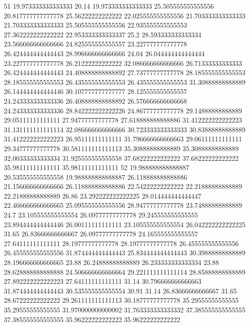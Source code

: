 51 19.973333333333333 20.14 19.973333333333333 25.505555555555556 20.817777777777778 25.56222222222222 22.025555555555556 21.703333333333333 21.703333333333333 25.505555555555556 22.935555555555553 27.362222222222222 22.953333333333337 25.2 28.593333333333334 23.566666666666666 24.825555555555557 23.227777777777778 26.424444444444443 28.996666666666666 24.04 26.044444444444444 23.227777777777778 26.21222222222222 32.086666666666666 26.71333333333333 26.424444444444443 24.408888888888892 27.73777777777778 28.185555555555553 28.185555555555553 26.435555555555553 26.435555555555553 31.30888888888889 26.144444444444446 30.107777777777777 28.125555555555557 24.243333333333336 26.408888888888892 26.576666666666668 24.243333333333336 28.842222222222226 24.86777777777778 29.14888888888889 29.05111111111111 27.94777777777778 27.618888888888886 31.412222222222223 31.131111111111114 32.086666666666666 30.723333333333333 30.83888888888889 31.412222222222223 26.95111111111111 31.796666666666663 29.06111111111111 29.34777777777778 30.581111111111113 35.30888888888889 35.30888888888889 32.00333333333334 31.925555555555558 37.68222222222222 37.68222222222222 35.98111111111111 35.98111111111111
52 19.988888888888887 20.535555555555558 19.988888888888887 26.118888888888886 21.156666666666666 26.118888888888886 22.54222222222222 22.21888888888889 22.21888888888889 26.86 23.292222222222225 28.014444444444447 22.466666666666665 25.095555555555556 28.94777777777778 23.74888888888889 24.7 23.105555555555554 26.09777777777778 29.245555555555555 23.894444444444446 26.00111111111111 23.105555555555554 26.042222222222225 31.65 26.83666666666667 26.09777777777778 24.165555555555557 27.64111111111111 28.19777777777778 28.19777777777778 26.455555555555556 26.455555555555556 31.874444444444443 25.834444444444443 30.39888888888889 28.196666666666665 23.88 26.24888888888889 26.233333333333334 23.88 28.628888888888888 24.506666666666664 29.221111111111114 28.85888888888889 27.892222222222223 27.64111111111111 31.14 30.796666666666663 31.874444444444443 30.535555555555554 30.91 31.14 26.83666666666667 31.65 28.67222222222222 29.261111111111113 30.18777777777778 35.29555555555555 35.29555555555555 31.970000000000002 31.763333333333332 37.385555555555555 37.385555555555555 35.96222222222222 35.96222222222222
